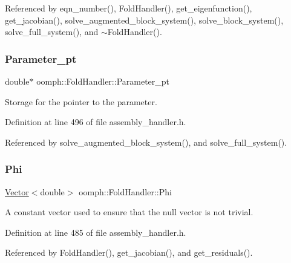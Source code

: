 Referenced by eqn\+\_\+number(), Fold\+Handler(), get\+\_\+eigenfunction(), get\+\_\+jacobian(), solve\+\_\+augmented\+\_\+block\+\_\+system(), solve\+\_\+block\+\_\+system(), solve\+\_\+full\+\_\+system(), and $\sim$\+Fold\+Handler().

\mbox{\label{classoomph_1_1FoldHandler_ae32fb6242e77a273f82de2c491d36314}} 
\subsubsection{\texorpdfstring{Parameter\+\_\+pt}{Parameter\_pt}}
{\footnotesize\ttfamily double$\ast$ oomph\+::\+Fold\+Handler\+::\+Parameter\+\_\+pt\hspace{0.3cm}{\ttfamily [private]}}



Storage for the pointer to the parameter. 



Definition at line 496 of file assembly\+\_\+handler.\+h.



Referenced by solve\+\_\+augmented\+\_\+block\+\_\+system(), and solve\+\_\+full\+\_\+system().

\mbox{\label{classoomph_1_1FoldHandler_a7b6ebf95bb87aab0c3df7daf841af3a8}} 
\subsubsection{\texorpdfstring{Phi}{Phi}}
{\footnotesize\ttfamily \hyperlink{classoomph_1_1Vector}{Vector}$<$double$>$ oomph\+::\+Fold\+Handler\+::\+Phi\hspace{0.3cm}{\ttfamily [private]}}



A constant vector used to ensure that the null vector is not trivial. 



Definition at line 485 of file assembly\+\_\+handler.\+h.



Referenced by Fold\+Handler(), get\+\_\+jacobian(), and get\+\_\+residuals().

